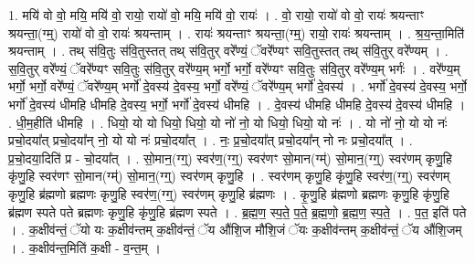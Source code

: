 \documentclass[17pt]{extarticle}
\begin{document}
1. मयि॑ वो वो॒ मयि॒ मयि॑ वो॒ रायो॒ रायो॑ वो॒ मयि॒ मयि॑ वो॒ रायः॑ । . वो॒ रायो॒ रायो॑ वो वो॒ रायः॑ श्रयन्ताꣳ श्रयन्ता॒(ग्म्॒) रायो॑ वो वो॒ रायः॑ श्रयन्ताम् । . रायः॑ श्रयन्ताꣳ श्रयन्ता॒(ग्म्॒) रायो॒ रायः॑ श्रयन्ताम् । . श्र॒य॒न्ता॒मिति॑ श्रयन्ताम् । . तथ् स॑वि॒तुः स॑वि॒तुस्तत् तथ् स॑वि॒तुर् वरे᳚ण्यं॒ ॅवरे᳚ण्यꣳ सवि॒तुस्तत् तथ् स॑वि॒तुर् वरे᳚ण्यम् । . स॒वि॒तुर् वरे᳚ण्यं॒ ॅवरे᳚ण्यꣳ सवि॒तुः स॑वि॒तुर् वरे᳚ण्य॒म् भर्गो॒ भर्गो॒ वरे᳚ण्यꣳ सवि॒तुः स॑वि॒तुर् वरे᳚ण्य॒म् भर्गः॑ । . वरे᳚ण्य॒म् भर्गो॒ भर्गो॒ वरे᳚ण्यं॒ ॅवरे᳚ण्य॒म् भर्गो॑ दे॒वस्य॑ दे॒वस्य॒ भर्गो॒ वरे᳚ण्यं॒ ॅवरे᳚ण्य॒म् भर्गो॑ दे॒वस्य॑ । . भर्गो॑ दे॒वस्य॑ दे॒वस्य॒ भर्गो॒ भर्गो॑ दे॒वस्य॑ धीमहि धीमहि दे॒वस्य॒ भर्गो॒ भर्गो॑ दे॒वस्य॑ धीमहि । . दे॒वस्य॑ धीमहि धीमहि दे॒वस्य॑ दे॒वस्य॑ धीमहि । . धी॒म॒हीति॑ धीमहि । . धियो॒ यो यो धियो॒ धियो॒ यो नो॑ नो॒ यो धियो॒ धियो॒ यो नः॑ । . यो नो॑ नो॒ यो यो नः॑ प्रचो॒दया᳚त् प्रचो॒दया᳚न् नो॒ यो यो नः॑ प्रचो॒दया᳚त् । . नः॒ प्र॒चो॒दया᳚त् प्रचो॒दया᳚न् नो नः प्रचो॒दया᳚त् । . प्र॒चो॒दया॒दिति॑ प्र - चो॒दया᳚त् । . सो॒मान॒(ग्ग्॒) स्वर॑ण॒(ग्ग्॒) स्वर॑णꣳ सो॒मान(ग्म्॑) सो॒मान॒(ग्ग्॒) स्वर॑णम् कृणु॒हि कृ॑णु॒हि स्वर॑णꣳ सो॒मान(ग्म्॑) सो॒मान॒(ग्ग्॒) स्वर॑णम् कृणु॒हि । . स्वर॑णम् कृणु॒हि कृ॑णु॒हि स्वर॑ण॒(ग्ग्॒) स्वर॑णम् कृणु॒हि ब्र॑ह्मणो ब्रह्मणः कृणु॒हि स्वर॑ण॒(ग्ग्॒) स्वर॑णम् कृणु॒हि ब्र॑ह्मणः । . कृ॒णु॒हि ब्र॑ह्मणो ब्रह्मणः कृणु॒हि कृ॑णु॒हि ब्र॑ह्मण स्पते पते ब्रह्मणः कृणु॒हि कृ॑णु॒हि ब्र॑ह्मण स्पते । . ब्र॒ह्म॒ण॒ स्प॒ते॒ प॒ते॒ ब्र॒ह्म॒णो॒ ब्र॒ह्म॒ण॒ स्प॒ते॒ । . प॒त॒ इति॑ पते । . क॒क्षीव॑न्तं॒ ॅयो यः क॒क्षीव॑न्तम् क॒क्षीव॑न्तं॒ ॅय औ॑शि॒ज मौ॑शि॒जं ॅयः क॒क्षीव॑न्तम् क॒क्षीव॑न्तं॒ ॅय औ॑शि॒जम् । . क॒क्षीव॑न्त॒मिति॑ क॒क्षी - व॒न्त॒म् । \newline
\end{document}
